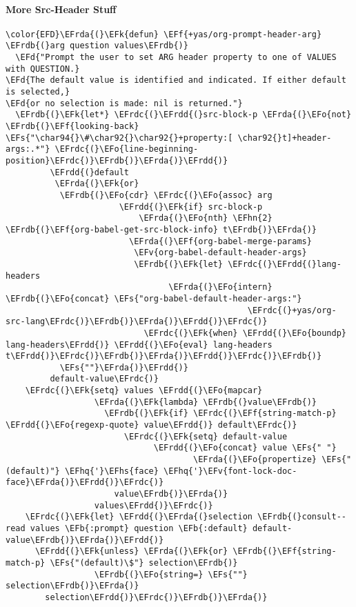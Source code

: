 \documentclass{article}
\newcommand{\EFs}[1]{\textcolor{EFs}{#1}} %
\newcommand{\EFd}[1]{\textcolor{EFd}{#1}} %
\newcommand{\EFk}[1]{\textcolor{EFk}{#1}} %
\newcommand{\EFb}[1]{\textcolor{EFb}{#1}} %
\newcommand{\EFf}[1]{\textcolor{EFf}{#1}} %
\newcommand{\EFv}[1]{\textcolor{EFv}{#1}} %
\newcommand{\EFo}[1]{\textcolor{EFo}{#1}} %
\newcommand{\EFhn}[1]{\textcolor{EFhn}{\textbf{#1}}} %
\newcommand{\EFhq}[1]{#1} %
\newcommand{\EFhs}[1]{\textcolor{EFhs}{#1}} %
\newcommand{\EFrda}[1]{\textcolor{EFrda}{#1}} %
\newcommand{\EFrdb}[1]{\textcolor{EFrdb}{#1}} %
\newcommand{\EFrdc}[1]{\textcolor{EFrdc}{#1}} %
\newcommand{\EFrdd}[1]{\textcolor{EFrdd}{#1}} %
\begin{document}
\paragraph{More Src-Header Stuff}
\label{sec:orgf876fc0}
\begin{Code}
\begin{Verbatim}
\color{EFD}\EFrda{(}\EFk{defun} \EFf{+yas/org-prompt-header-arg} \EFrdb{(}arg question values\EFrdb{)}
  \EFd{"Prompt the user to set ARG header property to one of VALUES with QUESTION.}
\EFd{The default value is identified and indicated. If either default is selected,}
\EFd{or no selection is made: nil is returned."}
  \EFrdb{(}\EFk{let*} \EFrdc{(}\EFrdd{(}src-block-p \EFrda{(}\EFo{not} \EFrdb{(}\EFf{looking-back} \EFs{"\char94{}\#\char92{}\char92{}+property:[ \char92{}t]+header-args:.*"} \EFrdc{(}\EFo{line-beginning-position}\EFrdc{)}\EFrdb{)}\EFrda{)}\EFrdd{)}
         \EFrdd{(}default
          \EFrda{(}\EFk{or}
           \EFrdb{(}\EFo{cdr} \EFrdc{(}\EFo{assoc} arg
                       \EFrdd{(}\EFk{if} src-block-p
                           \EFrda{(}\EFo{nth} \EFhn{2} \EFrdb{(}\EFf{org-babel-get-src-block-info} t\EFrdb{)}\EFrda{)}
                         \EFrda{(}\EFf{org-babel-merge-params}
                          \EFv{org-babel-default-header-args}
                          \EFrdb{(}\EFk{let} \EFrdc{(}\EFrdd{(}lang-headers
                                 \EFrda{(}\EFo{intern} \EFrdb{(}\EFo{concat} \EFs{"org-babel-default-header-args:"}
                                                 \EFrdc{(}+yas/org-src-lang\EFrdc{)}\EFrdb{)}\EFrda{)}\EFrdd{)}\EFrdc{)}
                            \EFrdc{(}\EFk{when} \EFrdd{(}\EFo{boundp} lang-headers\EFrdd{)} \EFrdd{(}\EFo{eval} lang-headers t\EFrdd{)}\EFrdc{)}\EFrdb{)}\EFrda{)}\EFrdd{)}\EFrdc{)}\EFrdb{)}
           \EFs{""}\EFrda{)}\EFrdd{)}
         default-value\EFrdc{)}
    \EFrdc{(}\EFk{setq} values \EFrdd{(}\EFo{mapcar}
                  \EFrda{(}\EFk{lambda} \EFrdb{(}value\EFrdb{)}
                    \EFrdb{(}\EFk{if} \EFrdc{(}\EFf{string-match-p} \EFrdd{(}\EFo{regexp-quote} value\EFrdd{)} default\EFrdc{)}
                        \EFrdc{(}\EFk{setq} default-value
                              \EFrdd{(}\EFo{concat} value \EFs{" "}
                                      \EFrda{(}\EFo{propertize} \EFs{"(default)"} \EFhq{'}\EFhs{face} \EFhq{'}\EFv{font-lock-doc-face}\EFrda{)}\EFrdd{)}\EFrdc{)}
                      value\EFrdb{)}\EFrda{)}
                  values\EFrdd{)}\EFrdc{)}
    \EFrdc{(}\EFk{let} \EFrdd{(}\EFrda{(}selection \EFrdb{(}consult--read values \EFb{:prompt} question \EFb{:default} default-value\EFrdb{)}\EFrda{)}\EFrdd{)}
      \EFrdd{(}\EFk{unless} \EFrda{(}\EFk{or} \EFrdb{(}\EFf{string-match-p} \EFs{"(default)\$"} selection\EFrdb{)}
                  \EFrdb{(}\EFo{string=} \EFs{""} selection\EFrdb{)}\EFrda{)}
        selection\EFrdd{)}\EFrdc{)}\EFrdb{)}\EFrda{)}
\end{Verbatim}
\end{Code}
\end{document}
